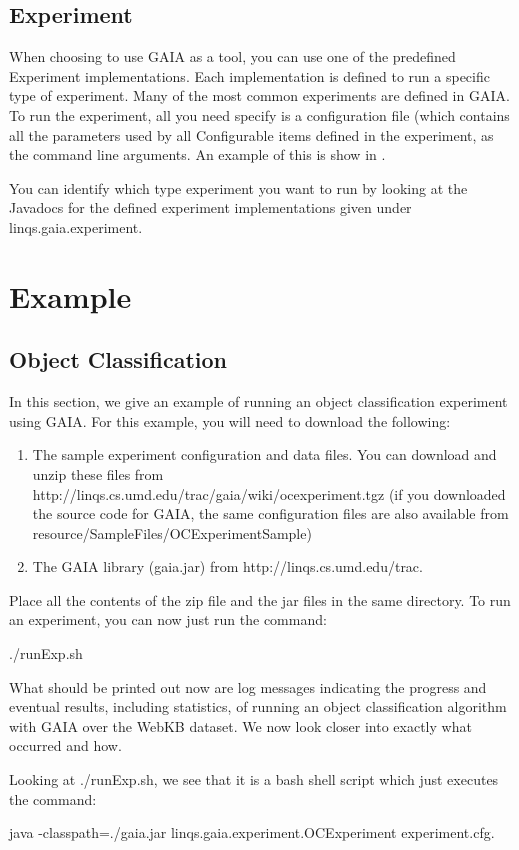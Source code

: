 \subsection{Experiment}
\label{experiment}
When choosing to use GAIA as a tool, you can use one of the predefined
Experiment implementations.  Each implementation is defined to run
a specific type of experiment.  Many of the most common experiments
are defined in GAIA.  To run the experiment, all you need specify is a configuration
file (which contains all the parameters used by all Configurable items defined in the experiment,
as the command line arguments.   An example of this is show in .

You can identify which type experiment you want to run by looking at the
Javadocs for the defined experiment implementations given under linqs.gaia.experiment.


\section{Example}
\label{basicexample}

\subsection{Object Classification}
In this section, we give an example of running an object classification experiment using GAIA.
For this example, you will need to download the following:

\begin{enumerate}
\item The sample experiment configuration and data files.  You can download and unzip these files from
http://linqs.cs.umd.edu/trac/gaia/wiki/ocexperiment.tgz (if you downloaded the source code
for GAIA, the same configuration files are also available from resource/SampleFiles/OCExperimentSample)
\item The GAIA library (gaia.jar) from http://linqs.cs.umd.edu/trac.
\end{enumerate}

Place all the contents of the zip file and the jar files in the same directory.
To run an experiment, you can now just run the command:

./runExp.sh

What should be printed out now are log messages indicating the progress
and eventual results, including statistics, of running an object classification
algorithm with GAIA over the WebKB dataset.  We now look closer into
exactly what occurred and how.

Looking at ./runExp.sh, we see that it is a bash shell script which just
executes the command:

java -classpath=./gaia.jar linqs.gaia.experiment.OCExperiment experiment.cfg.
